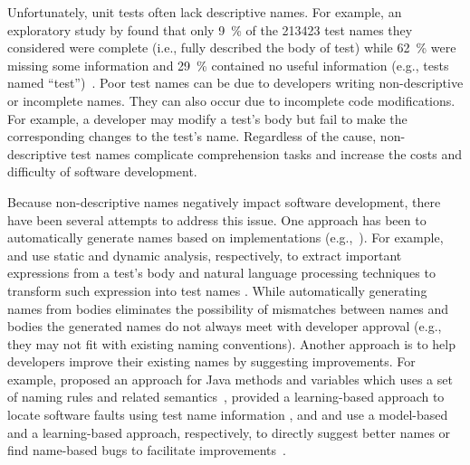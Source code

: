 \documentclass[proposal.tex]{subfiles}
\begin{document}
Unfortunately, unit tests often lack descriptive names.
%
For example, an exploratory study by \citeauthor{zhang2015automatically} found that only \SI{9}{\percent} of the \num{213423} test names they considered were complete (i.e., fully described the body of test) while \SI{62}{\percent} were missing some information and \SI{29}{\percent} contained no useful information (e.g., tests named \enquote{test})~\cite{zhang2015automatically}.
%
Poor test names can be due to developers writing non-descriptive or incomplete names.
%
They can also occur due to incomplete code modifications.
%
For example, a developer may modify a test's body but fail to make the corresponding changes to the test's name.
%
Regardless of the cause, non-descriptive test names complicate comprehension tasks and increase the costs and difficulty of software development.


Because non-descriptive names negatively impact software development, there have been several attempts to address this issue.
%
One approach has been to automatically generate names based on implementations (e.g.,~\cite{arcuri2014automated, zhang2015automatically, daka2017generating}).
%
For example, \citeauthor{zhang2015automatically} and \citeauthor{daka2017generating} use static and dynamic analysis, respectively, to extract important expressions from a test's body and natural language processing techniques to transform such expression into test names \cite{zhang2015automatically, daka2017generating}. 
%
While automatically generating names from bodies eliminates the possibility of mismatches between names and bodies the generated names do not always meet with developer approval (e.g., they may not fit with existing naming conventions).
%
Another approach is to help developers improve their existing names by suggesting improvements.  
%
For example, \citeauthor{host2009debugging} proposed an approach for Java methods and variables which uses a set of naming rules and related semantics~\cite{host2009debugging}, \citeauthor{li2019deepfl} provided a learning-based approach to locate software faults using test name information \cite{li2019deepfl}, and \citeauthor{allamanis2015suggesting} and \citeauthor{pradel2018deepbugs} use a model-based and a learning-based approach, respectively, to directly suggest better names or find name-based bugs to facilitate improvements~\cite{allamanis2015suggesting, pradel2018deepbugs}.
\end{document}
